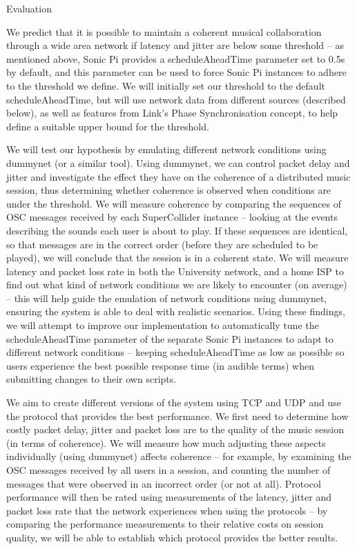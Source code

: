 \documentclass[12pt,a4paper,twoside]{article}
\begin{document}
\Large
Evaluation

\normalsize

We predict that it is possible to maintain a coherent musical collaboration through a wide area network if latency and jitter are below some threshold -- as mentioned above, Sonic Pi provides a scheduleAheadTime parameter set to 0.5s by default, and this parameter can be used to force Sonic Pi instances to adhere to the threshold we define. We will initially set our threshold to the default scheduleAheadTime, but will use network data from different sources (described below), as well as features from Link's Phase Synchronisation concept, to help define a suitable upper bound for the threshold.

We will test our hypothesis by emulating different network conditions using dummynet (or a similar tool). Using dummynet, we can control packet delay and jitter and investigate the effect they have on the coherence of a distributed music session, thus determining whether coherence is observed when conditions are under the threshold. We will measure coherence by comparing the sequences of OSC messages received by each SuperCollider instance -- looking at the events describing the sounds each user is about to play. If these sequences are identical, so that messages are in the correct order (before they are scheduled to be played), we will conclude that the session is in a coherent state. We will measure latency and packet loss rate in both the University network, and a home ISP to find out what kind of network conditions we are likely to encounter (on average) -- this will help guide the emulation of network conditions using dummynet, ensuring the system is able to deal with realistic scenarios. Using these findings, we will attempt to improve our implementation to automatically tune the scheduleAheadTime parameter of the separate Sonic Pi instances to adapt to different network conditions -- keeping scheduleAheadTime as low as possible so users experience the best possible response time (in audible terms) when submitting changes to their own scripts.

We aim to create different versions of the system using TCP and UDP and use the protocol that provides the best performance. We first need to determine how costly packet delay, jitter and packet loss are to the quality of the music session (in terms of coherence). We will measure how much adjusting these aspects individually (using dummynet) affects coherence -- for example, by examining the OSC messages received by all users in a session, and counting the number of messages that were observed in an incorrect order (or not at all). Protocol performance will then be rated using measurements of the latency, jitter and packet loss rate that the network experiences when using the protocols -- by comparing the performance measurements to their relative costs on session quality, we will be able to establish which protocol provides the better results.
\end{document}
